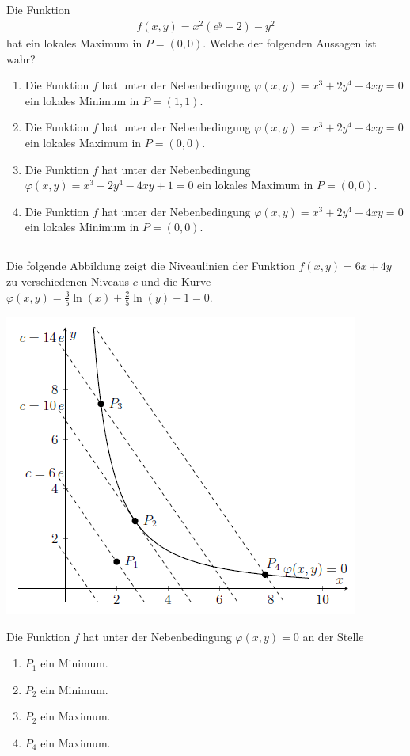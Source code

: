 \subsection*{}
Die Funktion
\begin{align*}
f(x,y) =x^2 (e^y -2) -y^2
\end{align*}
hat ein lokales Maximum in $ P = (0,0) $. Welche der folgenden Aussagen ist wahr?
\renewcommand{\labelenumi}{(\alph{enumi})}
\begin{enumerate}
\item Die Funktion $ f $ hat unter der Nebenbedingung $ \varphi(x,y)  = x^3 + 2y^4 - 4xy = 0$ ein lokales Minimum in $ P = (1,1) $.
\item Die Funktion $ f $ hat unter der Nebenbedingung $ \varphi(x,y)  = x^3 + 2y^4 - 4xy = 0$ ein lokales Maximum in $ P = (0,0) $.
\item Die Funktion $ f $ hat unter der Nebenbedingung $ \varphi(x,y)  = x^3 + 2y^4 - 4xy + 1 = 0$ ein lokales Maximum in $ P = (0,0) $.
\item Die Funktion $ f $ hat unter der Nebenbedingung $ \varphi(x,y)  = x^3 + 2y^4 - 4xy = 0$ ein lokales Minimum in $ P = (0,0) $.
\end{enumerate}
\newpage
\subsection*{}
Die folgende Abbildung zeigt die Niveaulinien der Funktion $ f(x,y ) = 6x + 4y  $ zu verschiedenen Niveaus $ c $ und die Kurve $ \varphi(x,y) = \frac{3}{5} \ln(x) + \frac{2}{5} \ln(y) - 1 = 0 $.
\begin{center}
	\includegraphics{pictures/frage2_3_aufgabe.png}
\end{center}
Die Funktion $ f $ hat unter der Nebenbedingung $ \varphi(x,y) = 0 $ an der Stelle
\renewcommand{\labelenumi}{(\alph{enumi})}
\begin{enumerate}
\item 
$ P_1 $ ein Minimum.
\item 
$ P_2 $ ein Minimum.
\item 
$ P_2 $ ein Maximum.
\item
$ P_4 $ ein Maximum.
\end{enumerate}
\ \\
